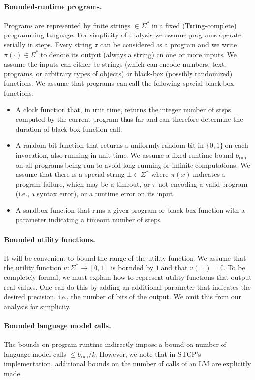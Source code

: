 \documentclass{article}
\begin{document}
\paragraph{Bounded-runtime programs.}
Programs are represented by finite strings $\in \Sigma^*$ in a fixed (Turing-complete) programming language. For simplicity of analysis we assume programs operate serially in steps. Every string $\pi$ can be considered as a program and we write $\pi(\cdot)\in \Sigma^*$ to denote its output (always a string) on one or more inputs. 
We assume the inputs can either be strings (which can encode numbers, text, programs, or arbitrary types of objects) or black-box (possibly randomized) functions. We assume that programs can call the following special black-box  functions:
\begin{itemize}[leftmargin=0.5cm]
    \item A clock function that, in unit time, returns the integer number of steps computed by the current program thus far and can therefore determine the duration of black-box function call.
    \item A random bit function that returns a uniformly random bit in $\{0,1\}$ on each invocation, also running in unit time. We assume a fixed runtime bound $b_\text{run}$ on all programs being run to avoid long-running or infinite computations. We assume that there is a special string $\bot \in \Sigma^*$ where $\pi(x)$ indicates a program failure, which may be a timeout, or $\pi$ not encoding a valid program (i.e., a syntax error), or a runtime error on its input. 
    \item A sandbox function that runs a given program or black-box function with a parameter indicating a timeout number of steps.   
\end{itemize}

\paragraph{Bounded utility functions.}
It will be convenient to bound the range of the utility function. We assume that the utility function $u:\Sigma^*\rightarrow [0,1]$ is bounded by $1$ and that $u(\bot)=0$. To be completely formal, we must explain how to represent utility functions that output real values. One can do this by adding an additional parameter that indicates the desired precision, i.e., the number of bits of the output. We omit this from our analysis for simplicity.

\paragraph{Bounded language model calls.}
The bounds on program runtime indirectly impose a bound on number of language model calls $\le b_\text{run}/k$. However, we note that in STOP's implementation, additional bounds on the number of calls of an LM are explicitly made. 
\end{document}
